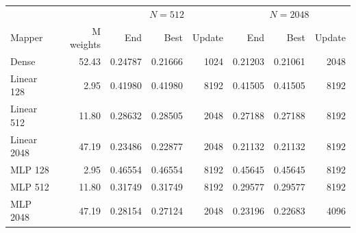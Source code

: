 \begin{tabular}{lrrrrrrr}
\toprule
 & & \multicolumn{3}{c}{$N=512$} & \multicolumn{3}{c}{$N=2048$} \\
Mapper & M weights & End & Best & Update & End & Best & Update \\
\midrule
Dense & 52.43 & 0.24787 & 0.21666 & 1024 & 0.21203 & 0.21061 & 2048 \\
Linear 128 & 2.95 & 0.41980 & 0.41980 & 8192 & 0.41505 & 0.41505 & 8192 \\
Linear 512 & 11.80 & 0.28632 & 0.28505 & 2048 & 0.27188 & 0.27188 & 8192 \\
Linear 2048 & 47.19 & 0.23486 & 0.22877 & 2048 & 0.21132 & 0.21132 & 8192 \\
MLP 128 & 2.95 & 0.46554 & 0.46554 & 8192 & 0.45645 & 0.45645 & 8192 \\
MLP 512 & 11.80 & 0.31749 & 0.31749 & 8192 & 0.29577 & 0.29577 & 8192 \\
MLP 2048 & 47.19 & 0.28154 & 0.27124 & 2048 & 0.23196 & 0.22683 & 4096 \\
\bottomrule
\end{tabular}
